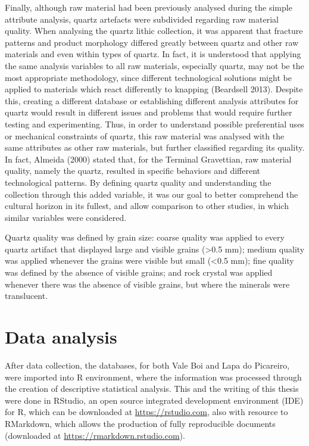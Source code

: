 \documentclass[12pt,twoside]{reedthesis}
\begin{document}
Finally, although raw material had been previously analysed during the simple attribute analysis, quartz artefacts were subdivided regarding raw material quality. When analysing the quartz lithic collection, it was apparent that fracture patterns and product morphology differed greatly between quartz and other raw materials and even within types of quartz. In fact, it is understood that applying the same analysis variables to all raw materials, especially quartz, may not be the most appropriate methodology, since different technological solutions might be applied to materials which react differently to knapping (Beardsell 2013). Despite this, creating a different database or establishing different analysis attributes for quartz would result in different issues and problems that would require further testing and experimenting. Thus, in order to understand possible preferential uses or mechanical constraints of quartz, this raw material was analysed with the same attributes as other raw materials, but further classified regarding its quality. In fact, Almeida (2000) stated that, for the Terminal Gravettian, raw material quality, namely the quartz, resulted in specific behaviors and different technological patterns. By defining quartz quality and understanding the collection through this added variable, it was our goal to better comprehend the cultural horizon in its fullest, and allow comparison to other studies, in which similar variables were considered.

Quartz quality was defined by grain size: coarse quality was applied to every quartz artifact that displayed large and visible grains (\textgreater0.5 mm); medium quality was applied whenever the grains were visible but small (\textless0.5 mm); fine quality was defined by the absence of visible grains; and rock crystal was applied whenever there was the absence of visible grains, but where the minerals were translucent.

\hypertarget{data-analysis}{%
\section{Data analysis}\label{data-analysis}}

After data collection, the databases, for both Vale Boi and Lapa do Picareiro, were imported into R environment, where the information was processed through the creation of descriptive statistical analysis. This and the writing of this thesis were done in RStudio, an open source integrated development environment (IDE) for R, which can be downloaded at \url{https://rstudio.com}, also with resource to RMarkdown, which allows the production of fully reproducible documents (downloaded at \url{https://rmarkdown.rstudio.com}).
\end{document}
